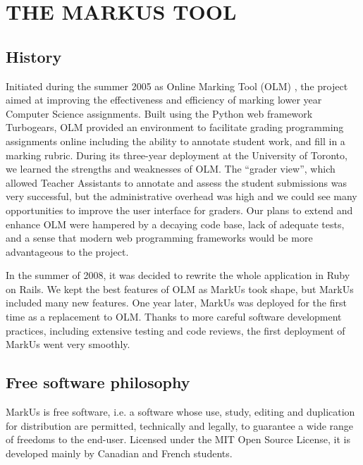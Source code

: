 \documentclass[twocolumn,10pt]{asme2e}
\begin{document}
\section*{THE MARKUS TOOL}



\subsection*{History}

Initiated during the summer 2005 as Online Marking Tool (OLM) \cite{olm}, the project aimed
at improving the effectiveness and efficiency of marking lower year Computer
Science assignments. Built using the Python web framework Turbogears, OLM
provided an environment to facilitate grading programming assignments online including the ability to annotate student work, and fill in a marking rubric. During its three-year deployment at the University of Toronto, we learned the strengths and weaknesses of OLM. The ``grader view'', which allowed Teacher Assistants to annotate and assess the student submissions was very successful, but the administrative overhead was high and we could see many opportunities to improve the user interface for graders. Our plans to extend and enhance OLM were hampered by a decaying code base, lack of adequate tests, and a sense that modern web programming frameworks would be more advantageous to the project.

In the summer of 2008, it was decided to rewrite the whole application in Ruby on Rails. We kept the best features of OLM as MarkUs took shape, but MarkUs included many new features. One year later, MarkUs was deployed for the first time as a replacement to OLM. Thanks to more careful software development practices, including extensive testing and code reviews, the first deployment of MarkUs went very smoothly.

\subsection*{Free software philosophy}
MarkUs is free software, i.e. a software whose use, study, editing and duplication for distribution are permitted, technically and legally, to guarantee a wide range of freedoms to the end-user. Licensed under the MIT Open Source License, it is developed mainly by Canadian and French students.
\end{document}
